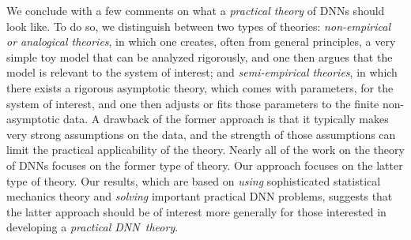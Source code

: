 We conclude with a few comments on what a \emph{practical theory} of DNNs should look like.
To do so, we distinguish between two types of theories:
\emph{non-empirical or analogical theories}, in which one creates, often from general principles, a very simple toy model that can be analyzed rigorously, and one then argues that the model is relevant to the system of interest; and 
\emph{semi-empirical theories}, in which there exists a rigorous asymptotic theory, which comes with parameters, for the system of interest, and one then adjusts or fits those parameters to the finite non-asymptotic data.
A drawback of the former approach is that it typically makes very strong assumptions on the data, and the strength of those assumptions can limit the practical applicability of the theory.
Nearly all of the work on the theory of DNNs focuses on the former type of theory.
Our approach focuses on the latter type of theory.
Our results, which are based on \emph{using} sophisticated statistical mechanics theory and \emph{solving} important practical DNN problems, suggests that the latter approach should be of interest more generally for those interested in developing a \emph{practical DNN~theory}.


